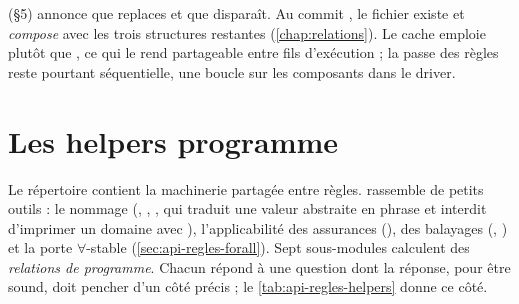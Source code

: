 \begin{remarque}
 (§5) annonce que \og {} replaces \fg{} et que  disparaît. Au commit \snapshotCommit, le fichier existe et  \emph{compose}  avec les trois structures restantes (\cref{chap:relations}). Le cache emploie  plutôt que , ce qui le rend partageable entre fils d'exécution ; la passe des règles reste pourtant séquentielle, une boucle  sur les composants dans le driver.
\end{remarque}

\section{Les helpers programme}
\label{sec:api-regles-helpers}

Le répertoire  contient la machinerie partagée entre règles.  rassemble de petits outils : le nommage (, , , qui traduit une valeur abstraite en phrase et interdit d'imprimer un domaine avec ), l'applicabilité des assurances (), des balayages (, ) et la porte $\forall$-stable (\cref{sec:api-regles-forall}). Sept sous-modules calculent des \emph{relations de programme}. Chacun répond à une question dont la réponse, pour être sound, doit pencher d'un côté précis ; le \cref{tab:api-regles-helpers} donne ce côté.

